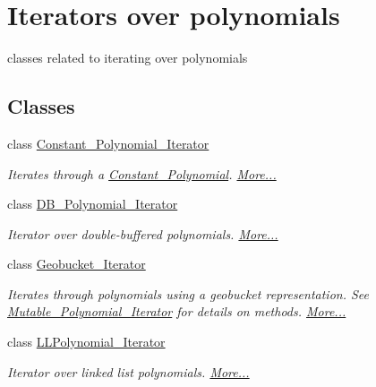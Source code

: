 \hypertarget{group___iterator_group}{}\section{Iterators over polynomials}
\label{group___iterator_group}


classes related to iterating over polynomials  


\subsection*{Classes}
\begin{DoxyCompactItemize}
\item 
class \hyperlink{group___iterator_group_class_constant___polynomial___iterator}{Constant\+\_\+\+Polynomial\+\_\+\+Iterator}
\begin{DoxyCompactList}\small\item\em Iterates through a \hyperlink{group__polygroup_class_constant___polynomial}{Constant\+\_\+\+Polynomial}.  \hyperlink{group___iterator_group_class_constant___polynomial___iterator}{More...}\end{DoxyCompactList}\item 
class \hyperlink{group___iterator_group_class_d_b___polynomial___iterator}{D\+B\+\_\+\+Polynomial\+\_\+\+Iterator}
\begin{DoxyCompactList}\small\item\em Iterator over double-\/buffered polynomials.  \hyperlink{group___iterator_group_class_d_b___polynomial___iterator}{More...}\end{DoxyCompactList}\item 
class \hyperlink{group___iterator_group_class_geobucket___iterator}{Geobucket\+\_\+\+Iterator}
\begin{DoxyCompactList}\small\item\em Iterates through polynomials using a geobucket representation. See \hyperlink{group___iterator_group_class_mutable___polynomial___iterator}{Mutable\+\_\+\+Polynomial\+\_\+\+Iterator} for details on methods.  \hyperlink{group___iterator_group_class_geobucket___iterator}{More...}\end{DoxyCompactList}\item 
class \hyperlink{group___iterator_group_class_l_l_polynomial___iterator}{L\+L\+Polynomial\+\_\+\+Iterator}
\begin{DoxyCompactList}\small\item\em Iterator over linked list polynomials.  \hyperlink{group___iterator_group_class_l_l_polynomial___iterator}{More...}\end{DoxyCompactList}\item 

\end{DoxyCompactItemize}
